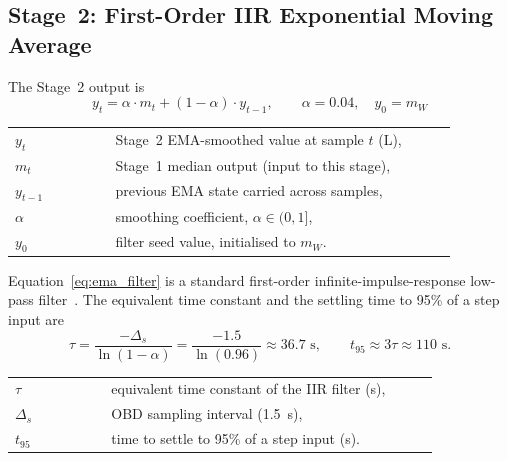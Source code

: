 \subsection{Stage~2: First-Order IIR Exponential Moving Average}
\label{sec:fuel_ema}

The Stage~2 output is
\begin{equation}
y_t = \alpha \cdot m_t + (1 - \alpha) \cdot y_{t-1}, \qquad \alpha = 0.04, \quad y_0 = m_W
\label{eq:ema_filter}
\end{equation}
\noindent\begin{tabular}{@{}p{0.20\linewidth}@{\quad}p{0.68\linewidth}@{}}
$y_t$ & Stage~2 EMA-smoothed value at sample $t$ (L), \\
$m_t$ & Stage~1 median output (input to this stage), \\
$y_{t-1}$ & previous EMA state carried across samples, \\
$\alpha$ & smoothing coefficient, $\alpha \in (0, 1]$, \\
$y_0$ & filter seed value, initialised to $m_W$.
\end{tabular}

\vspace{0.5em}
Equation~\ref{eq:ema_filter} is a standard first-order infinite-impulse-response low-pass filter~\cite{oppenheim2010dsp}. The equivalent time constant and the settling time to 95\% of a step input are
\begin{equation}
\tau = \frac{-\Delta_s}{\ln(1 - \alpha)} = \frac{-1.5}{\ln(0.96)} \approx 36.7 \text{ s}, \qquad t_{95} \approx 3\tau \approx 110 \text{ s}.
\label{eq:ema_time_constant}
\end{equation}
\noindent\begin{tabular}{@{}p{0.20\linewidth}@{\quad}p{0.68\linewidth}@{}}
$\tau$ & equivalent time constant of the IIR filter (s), \\
$\Delta_s$ & OBD sampling interval (1.5~s), \\
$t_{95}$ & time to settle to 95\% of a step input (s).
\end{tabular}

\vspace{0.5em}

